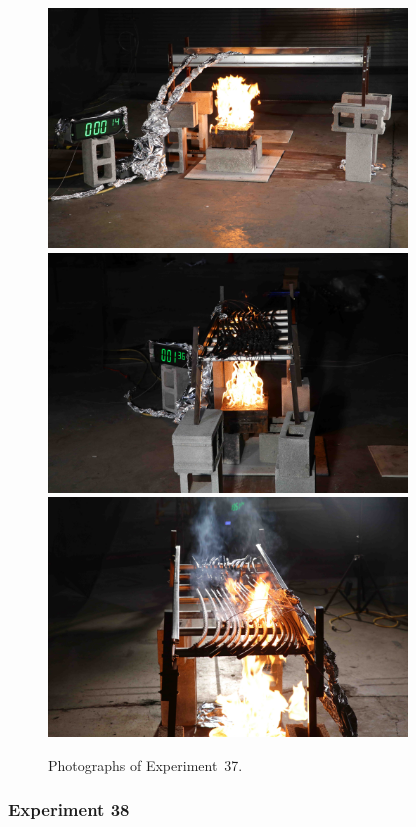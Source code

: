 \begin{figure}[p]
\centering
\includegraphics[height=2.50in]{../FIGURES/Test_37_side} \\
\includegraphics[height=2.50in]{../FIGURES/Test_37_1_min_36_s} \\
\includegraphics[height=2.50in]{../FIGURES/Test_37_ignition}
\caption[Photographs of Experiment~37]{Photographs of Experiment~37.}
\label{fig:Test_37_photos}
\end{figure}


\clearpage

\subsubsection{Experiment 38}

